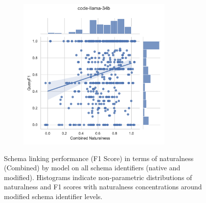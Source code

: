 \begin{figure}
\begin{subfigure}{.5\textwidth}
    \end{subfigure}%
    \begin{subfigure}{.5\textwidth}
      \centering
      \includegraphics[height=3in]{figures/distribution-jointplots/jointplot-code-llama-34b-combined-nat-all-schemas-f1-with-distributions.pdf}
    \end{subfigure}
    \caption{Schema linking performance (F1 Score) in terms of naturalness (Combined) by model on all schema identifiers (native and modified). Histograms indicate non-parametric distributions of naturalness and F1 scores with naturalness concentrations around modified schema identifier levels.}
    \label{fig:distribution-jointplot-combined-f1}
  \end{figure}



